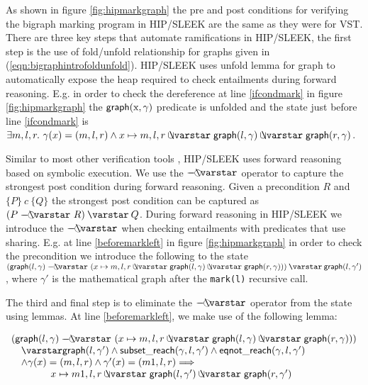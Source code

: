 As shown in figure \ref{fig:hipmarkgraph} the pre and post conditions for verifying the bigraph marking program in HIP/SLEEK are the same as they were for VST. There are three key steps that automate ramifications in HIP/SLEEK, the first step is the use of fold/unfold relationship for graphs given in (\ref{eqn:bigraphintrofoldunfold}). HIP/SLEEK uses unfold lemma for graph to automatically expose the heap required to check entailments during forward reasoning. E.g. in order to check the dereference at line \ref{ifcondmark} in figure \ref{fig:hipmarkgraph} the $\mathsf{graph}(\text{x},\gamma)$ predicate is unfolded and the state just before line \ref{ifcondmark} is $ \exists m,l,r.~ \gamma(x)=(m,l,r) \wedge x \mapsto m,l,r \ocon \p{graph}(l, \gamma) \ocon \p{graph}(r, \gamma)$.

Similar to most other verification tools \cite{Beckert:2007,DistefanoP08,berdine:smallfoot,jacobs:verifast}, HIP/SLEEK uses forward reasoning based on symbolic execution. We use the $\septraction$ operator to capture the strongest post condition during forward reasoning. Given a precondition $R$ and $\{P\}~c~\{Q\}$ the strongest post condition can be captured as $(P \septraction R) \scon Q$. During forward reasoning in HIP/SLEEK we introduce the $\septraction$ when checking entailments with predicates that use sharing. E.g. at line \ref{beforemarkleft} in figure \ref{fig:hipmarkgraph} in order to check the precondition we introduce the following to the state $ (\p{graph}(l, \gamma) \septraction (x \mapsto m,l,r \ocon \p{graph}(l, \gamma) \ocon \p{graph}(r, \gamma))) \scon \p{graph}(l, \gamma')$, where $\gamma'$ is the mathematical graph after the \texttt{mark(l)} recursive call.

The third and final step is to eliminate the $\septraction$ operator from the state using lemmas. At line \ref{beforemarkleft}, we make use of the following lemma:

\[
\begin{array}{l}
(\p{graph}(l, \gamma) \septraction (x \mapsto m,l,r \ocon \p{graph}(l, \gamma) \ocon \p{graph}(r, \gamma))) \\
\quad \scon \p{graph}(l, \gamma') \wedge \p{subset\_reach}(\gamma,l,\gamma') \wedge \p{eqnot\_reach}(\gamma,l,\gamma') \\
\quad \wedge  \gamma(x)=(m,l,r) \wedge \gamma'(x)=(m1,l,r) ==> \\
\qquad \qquad x \mapsto m1,l,r \ocon \p{graph}(l, \gamma') \ocon \p{graph}(r, \gamma')
\end{array}
\]

